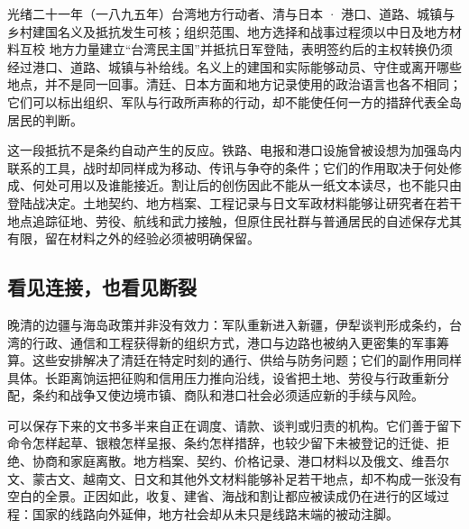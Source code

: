 \begin{event}{}{光绪二十一年（一八九五年）}{台湾地方行动者、清与日本 · 港口、道路、城镇与乡村}{建国名义及抵抗发生可核；组织范围、地方选择和战事过程须以中日及地方材料互校}
地方力量建立“台湾民主国”并抵抗日军登陆，表明签约后的主权转换仍须经过港口、道路、城镇与补给线。名义上的建国和实际能够动员、守住或离开哪些地点，并不是同一回事。清廷、日本方面和地方记录使用的政治语言也各不相同；它们可以标出组织、军队与行政所声称的行动，却不能使任何一方的措辞代表全岛居民的判断。

这一段抵抗不是条约自动产生的反应。铁路、电报和港口设施曾被设想为加强岛内联系的工具，战时却同样成为移动、传讯与争夺的条件；它们的作用取决于何处修成、何处可用以及谁能接近。割让后的创伤因此不能从一纸文本读尽，也不能只由登陆战决定。土地契约、地方档案、工程记录与日文军政材料能够让研究者在若干地点追踪征地、劳役、航线和武力接触，但原住民社群与普通居民的自述保存尤其有限，留在材料之外的经验必须被明确保留。
\end{event}

\subsection{看见连接，也看见断裂}

晚清的边疆与海岛政策并非没有效力：军队重新进入新疆，伊犁谈判形成条约，台湾的行政、通信和工程获得新的组织方式，港口与边路也被纳入更密集的军事筹算。这些安排解决了清廷在特定时刻的通行、供给与防务问题；它们的副作用同样具体。长距离饷运把征购和信用压力推向沿线，设省把土地、劳役与行政重新分配，条约和战争又使边境市镇、商队和港口社会必须适应新的手续与风险。

可以保存下来的文书多半来自正在调度、请款、谈判或归责的机构。它们善于留下命令怎样起草、银粮怎样呈报、条约怎样措辞，也较少留下未被登记的迁徙、拒绝、协商和家庭离散。地方档案、契约、价格记录、港口材料以及俄文、维吾尔文、蒙古文、越南文、日文和其他外文材料能够补足若干地点，却不构成一张没有空白的全景。正因如此，收复、建省、海战和割让都应被读成仍在进行的区域过程：国家的线路向外延伸，地方社会却从未只是线路末端的被动注脚。
